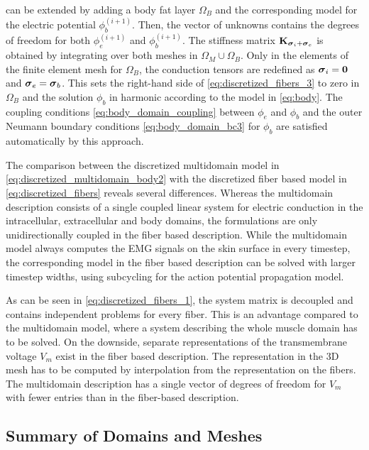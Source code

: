  can be extended by adding a body fat layer $\Omega_B$ and the corresponding model for the electric potential $\phi_b^{(i+1)}$. Then, the vector of unknowns contains the degrees of freedom for both $\phi_e^{(i+1)}$ and $\phi_b^{(i+1)}$. The stiffness matrix $\textbf{K}_{\boldsymbol{\sigma}_i + \boldsymbol{\sigma}_e}$ is obtained by integrating over both meshes in $\Omega_M \cup \Omega_B$. Only in the elements of the finite element mesh for $\Omega_B$, the conduction tensors are redefined as $\boldsymbol{\sigma}_i = \textbf{0}$ and $\boldsymbol{\sigma}_e = \boldsymbol{\sigma}_b$. This sets the right-hand side of \cref{eq:discretized_fibers_3} to zero in $\Omega_B$ and the solution $\phi_b$ in harmonic according to the model in \cref{eq:body}. The coupling conditions \cref{eq:body_domain_coupling} between $\phi_e$ and $\phi_b$ and the outer Neumann boundary conditions \cref{eq:body_domain_bc3} for $\phi_b$ are satisfied automatically by this approach.

The comparison between the discretized multidomain model in \cref{eq:discretized_multidomain_body2} with the discretized fiber based model in \cref{eq:discretized_fibers} reveals several differences. Whereas the multidomain description consists of a single coupled linear system for electric conduction in the intracellular, extracellular and body domains, the formulations are only unidirectionally coupled in the fiber based description. While the multidomain model always computes the EMG signals on the skin surface in every timestep, the corresponding model in the fiber based description can be solved with larger timestep widths, using subcycling for the action potential propagation model.

As can be seen in \cref{eq:discretized_fibers_1}, the system matrix is decoupled and contains independent problems for every fiber. This is an advantage compared to the multidomain model, where a system describing the whole muscle domain has to be solved. On the downside, separate representations of the transmembrane voltage $V_m$ exist in the fiber based description. The representation in the 3D mesh has to be computed by interpolation from the representation on the fibers. The multidomain description has a single vector of degrees of freedom for $V_m$ with fewer entries than in the fiber-based description.

\subsection{Summary of Domains and Meshes}

